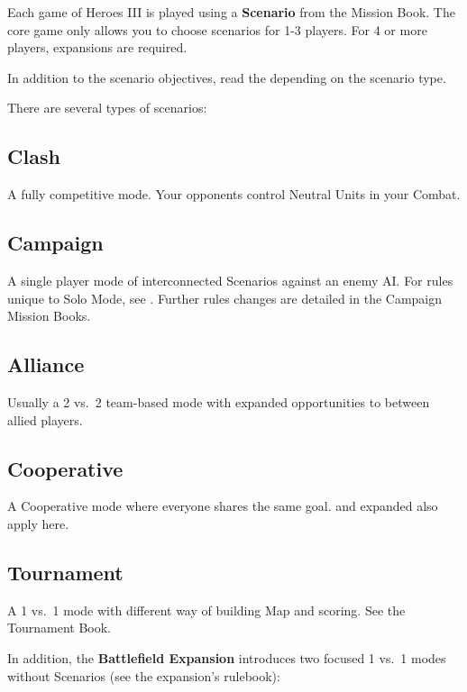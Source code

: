 
\begin{multicols*}{2}

Each game of Heroes III is played using a \textbf{Scenario} from the Mission Book. 
The core game only allows you to choose scenarios for 1-3 players. For 4 or more players, expansions are required.\par
In addition to the scenario objectives, read the  depending on the scenario type.\par 
There are several types of scenarios:

\subsection*{Clash}
A fully competitive mode.
Your opponents control Neutral Units in your Combat.

\subsection*{Campaign}
A single player mode of interconnected Scenarios against an enemy AI.
For rules unique to Solo Mode, see .
Further rules changes are detailed in the Campaign Mission Books.

\subsection*{Alliance}
Usually a 2 vs.~2 team-based mode with expanded opportunities to  between allied players.

\subsection*{Cooperative}
A Cooperative mode where everyone shares the same goal.  and expanded  also apply here.

\subsection*{Tournament}
A 1 vs.~1 mode with different way of building Map and scoring. See the Tournament Book.

\columnbreak

In addition, the \textbf{Battlefield Expansion} introduces two focused 1 vs.~1 modes without Scenarios (see the expansion's rulebook):


\end{multicols*}

